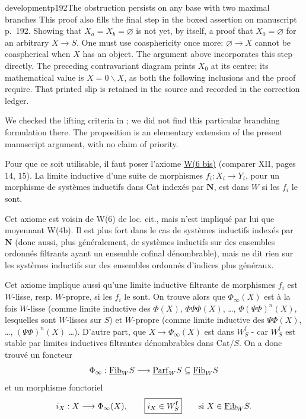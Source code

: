 \begin{dcomment}{development}{p192}{The obstruction persists on any base with two maximal branches}
This proof also fills the final step in the boxed assertion on manuscript p.~192. Showing that $X_a=X_b=\varnothing$ is not yet, by itself, a proof that $X_0=\varnothing$ for an arbitrary $X\to S$. One must use coasphericity once more: $\varnothing\to X$ cannot be coaspherical when $X$ has an object. The argument above incorporates this step directly. The preceding contravariant diagram prints $X_0$ at its centre; its mathematical value is $X=0\backslash X$, as both the following inclusions and the proof require. That printed slip is retained in the source and recorded in the correction ledger.

We checked the lifting criteria in \citet[Proposition~4.3, Theorem~4.13, and Example~4.17]{Maltsiniotis2005Asphericite}; we did not find this particular branching formulation there. The proposition is an elementary extension of the present manuscript argument, with no claim of priority.
\end{dcomment}


Pour que ce soit utilisable, il faut poser l'axiome \underline{W(6 bis)} (comparer XII, pages 14, 15). La limite inductive d'une suite de morphismes $f_i : X_i \longrightarrow Y_i$, pour un morphisme de systèmes inductifs dans Cat indexés par $\mathbf{N}$, est dans $W$ si les $f_i$ le sont.

Cet axiome est voisin de W(6) de loc. cit., mais n'est impliqué par lui que moyennant W(4b). Il est plus fort dans le cas de systèmes inductifs indexés par $\mathbf{N}$ (donc aussi, plus généralement, de systèmes inductifs sur des ensembles ordonnés filtrants ayant un ensemble cofinal dénombrable), mais ne dit rien sur les systèmes inductifs sur des ensembles ordonnés d'indices plus généraux.

Cet axiome implique aussi qu'une limite inductive filtrante de morphismes $f_i$ est $W$-lisse, resp. $W$-propre, si les $f_i$ le sont. On trouve alors que $\Phi_\infty(X)$ est à la fois $W$-lisse (comme limite inductive des $\Phi(X)$, $\Phi\Psi\Phi(X)$, \ldots, $\Phi(\Psi\Phi)^n(X)$, lesquelles sont $W$-lisses sur $S$) et $W$-propre (comme limite inductive des $\Psi\Phi(X)$, \ldots, $(\Psi\Phi)^n(X)$ \ldots). D'autre part, que $X \longrightarrow \Phi_\infty(X)$ est dans $W_S^{\mathrm{f}}$ - car $W_S^{\mathrm{f}}$ est stable par limites inductives filtrantes dénombrables dans $\mathrm{Cat}/S$. On a donc trouvé un foncteur
\[
\Phi_\infty : \underline{\mathrm{Fib}}_W S \longrightarrow \underline{\mathrm{Parf}}_W S \subseteq \underline{\mathrm{Fib}}_W S
\]
et un morphisme fonctoriel
\[
i_X : X \longrightarrow \Phi_\infty(X), \qquad \boxed{i_X \in W_S^{\mathrm{f}}} \qquad \text{si } X \in \underline{\mathrm{Fib}}_W S.
\]

